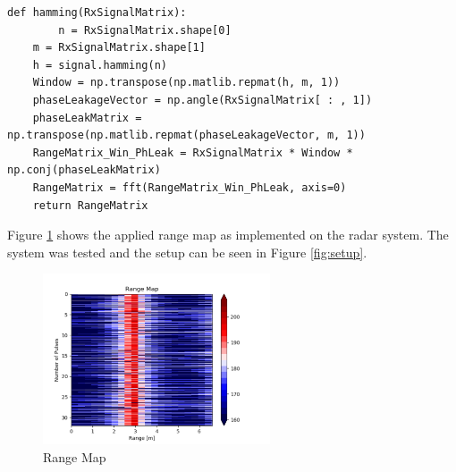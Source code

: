 {\small\begin{verbatim}
def hamming(RxSignalMatrix):
        n = RxSignalMatrix.shape[0]
    m = RxSignalMatrix.shape[1]
    h = signal.hamming(n)
    Window = np.transpose(np.matlib.repmat(h, m, 1))
    phaseLeakageVector = np.angle(RxSignalMatrix[ : , 1])
    phaseLeakMatrix = np.transpose(np.matlib.repmat(phaseLeakageVector, m, 1))  
    RangeMatrix_Win_PhLeak = RxSignalMatrix * Window * np.conj(phaseLeakMatrix)
    RangeMatrix = fft(RangeMatrix_Win_PhLeak, axis=0) 
    return RangeMatrix 
\end{verbatim}}

Figure \ref{fig:rangemap} shows the applied range map as implemented on the radar system. The system was tested and the setup can be seen in Figure \ref{fig:setup}.

\begin{figure}[h!]
    \centering
    \includegraphics[width = 0.6\textwidth]{images/rangemap.pdf}
    \caption{Range Map}\label{fig:rangemap}
\end{figure}

